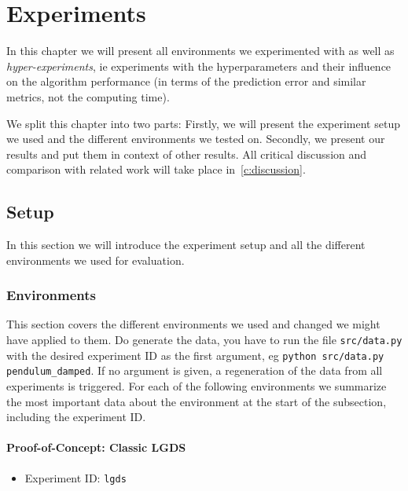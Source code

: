 \chapter{Experiments}
\label{c:experiments}



In this chapter we will present all environments we experimented with as well as \emph{hyper-experiments}, \ac{ie} experiments with the hyperparameters and their influence on the algorithm performance (in terms of the prediction error and similar metrics, not the computing time).

We split this chapter into two parts: Firstly, we will present the experiment setup we used and the different environments we tested on. Secondly, we present our results and put them in context of other results. All critical discussion and comparison with related work will take place in~\autoref{c:discussion}.

\section{Setup}
	In this section we will introduce the experiment setup and all the different environments we used for evaluation.

	\subsection{Environments}
		This section covers the different environments we used and changed we might have applied to them. Do generate the data, you have to run the file \texttt{src/data.py} with the desired experiment ID as the first argument, \ac{eg} \texttt{python src/data.py pendulum\_damped}. If no argument is given, a regeneration of the data from all experiments is triggered. For each of the following environments we summarize the most important data about the environment at the start of the subsection, including the experiment ID.

		\subsubsection{Proof-of-Concept: Classic LGDS}
			\begin{itemize}
				\item Experiment ID: \texttt{lgds}
			\end{itemize}

